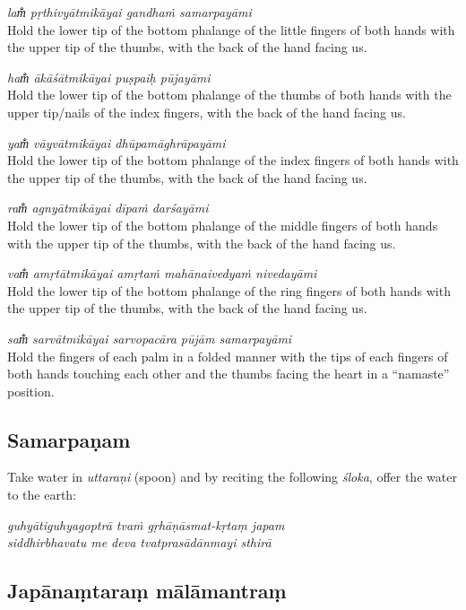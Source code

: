 \documentclass[12pt,oneside,a4paper]{article}
\newenvironment{shloka}[1]
  {\bigskip\center#1\varwidth{\linewidth}}
  {\endvarwidth\endcenter\bigskip}
\newcommand{\tl}[1]{\emph{#1}}
\begin{document}
\tl{lam̐ pṛthivyātmikāyai gandhaṁ samarpayāmi}\\
Hold the lower tip of the bottom phalange of the little fingers of both hands
with the upper tip of the thumbs, with the back of the hand facing us.

\tl{ham̐ ākāśātmikāyai puṣpaiḥ pūjayāmi}\\
Hold the lower tip of the bottom phalange of the thumbs of both hands with
the upper tip/nails of the index fingers, with the back of the hand facing us.

\tl{yam̐ vāyvātmikāyai dhūpamāghrāpayāmi}\\
Hold the lower tip of the bottom phalange of the index fingers of both hands
with the upper tip of the thumbs, with the back of the hand facing us.

\tl{ram̐ agnyātmikāyai dīpaṁ darśayāmi}\\
Hold the lower tip of the bottom phalange of the middle fingers of both hands
with the upper tip of the thumbs, with the back of the hand facing us.

\tl{vam̐ amṛtātmikāyai amṛtaṁ mahānaivedyaṁ nivedayāmi}\\
Hold the lower tip of the bottom phalange of the ring fingers of both hands
with the upper tip of the thumbs, with the back of the hand facing us.

\tl{sam̐ sarvātmikāyai sarvopacāra pūjām samarpayāmi}\\
Hold the fingers of each palm in a folded manner with the tips of each fingers
of both hands touching each other and the thumbs facing the heart in
a ``namaste'' position.

\subsection{Samarpaṇam}

Take water in \tl{uttaraṇi} (spoon) and by reciting the following \tl{śloka},
offer the water to the earth:

\begin{shloka}\itshape
  guhyātiguhyagoptrā tvaṁ gṛhāṇāsmat-kṛtaṃ japam\\
  siddhirbhavatu me deva tvatprasādānmayi sthirā
\end{shloka}

\subsection{Japānaṃtaraṃ mālāmantraṃ}
\end{document}
